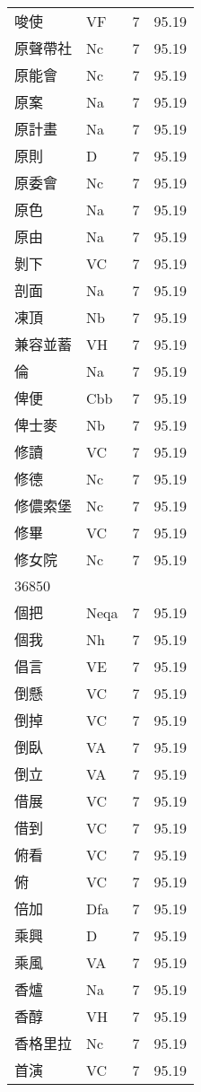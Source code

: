 \documentclass[twocolumn]{book}
\begin{document}
\begin{supertabular}{llrr}
唆使 & VF & 7 &  95.19\\
原聲帶社 & Nc & 7 &  95.19\\
原能會 & Nc & 7 &  95.19\\
原案 & Na & 7 &  95.19\\
原計畫 & Na & 7 &  95.19\\
原則 & D & 7 &  95.19\\
原委會 & Nc & 7 &  95.19\\
原色 & Na & 7 &  95.19\\
原由 & Na & 7 &  95.19\\
剝下 & VC & 7 &  95.19\\
剖面 & Na & 7 &  95.19\\
凍頂 & Nb & 7 &  95.19\\
兼容並蓄 & VH & 7 &  95.19\\
倫 & Na & 7 &  95.19\\
俾便 & Cbb & 7 &  95.19\\
俾士麥 & Nb & 7 &  95.19\\
修讀 & VC & 7 &  95.19\\
修德 & Nc & 7 &  95.19\\
修儂索堡 & Nc & 7 &  95.19\\
修畢 & VC & 7 &  95.19\\
修女院 & Nc & 7 &  95.19\\
36850\\
個把 & Neqa & 7 &  95.19\\
個我 & Nh & 7 &  95.19\\
倡言 & VE & 7 &  95.19\\
倒懸 & VC & 7 &  95.19\\
倒掉 & VC & 7 &  95.19\\
倒臥 & VA & 7 &  95.19\\
倒立 & VA & 7 &  95.19\\
借展 & VC & 7 &  95.19\\
借到 & VC & 7 &  95.19\\
俯看 & VC & 7 &  95.19\\
俯 & VC & 7 &  95.19\\
倍加 & Dfa & 7 &  95.19\\
乘興 & D & 7 &  95.19\\
乘風 & VA & 7 &  95.19\\
香爐 & Na & 7 &  95.19\\
香醇 & VH & 7 &  95.19\\
香格里拉 & Nc & 7 &  95.19\\
首演 & VC & 7 &  95.19\\

\end{supertabular}
\end{document}
